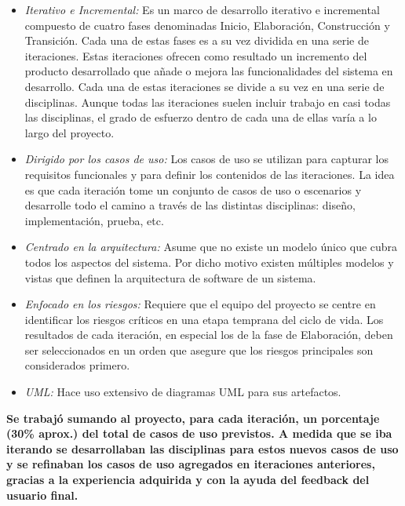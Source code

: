 \begin{itemize}
    \item \emph{Iterativo e Incremental:} Es un marco de desarrollo iterativo e incremental compuesto de cuatro fases denominadas Inicio, Elaboración, Construcción y Transición. Cada una de estas fases es a su vez dividida en una serie de iteraciones. Estas iteraciones ofrecen como resultado un incremento del producto desarrollado que añade o mejora las funcionalidades del sistema en desarrollo. Cada una de estas iteraciones se divide a su vez en una serie de disciplinas. Aunque todas las iteraciones suelen incluir trabajo en casi todas las disciplinas, el grado de esfuerzo dentro de cada una de ellas varía a lo largo del proyecto.
    \item \emph{Dirigido por los casos de uso:} Los casos de uso se utilizan para capturar los requisitos funcionales y para definir los contenidos de las iteraciones. La idea es que cada iteración tome un conjunto de casos de uso o escenarios y desarrolle todo el camino a través de las distintas disciplinas: diseño, implementación, prueba, etc.
    \item \emph{Centrado en la arquitectura:} Asume que no existe un modelo único que cubra todos los aspectos del sistema. Por dicho motivo existen múltiples modelos y vistas que definen la arquitectura de software de un sistema.
    \item \emph{Enfocado en los riesgos:} Requiere que el equipo del proyecto se centre en identificar los riesgos críticos en una etapa temprana del ciclo de vida. Los resultados de cada iteración, en especial los de la fase de Elaboración, deben ser seleccionados en un orden que asegure que los riesgos principales son considerados primero.
    \item \emph{UML:} Hace uso extensivo de diagramas UML para sus artefactos.
\end{itemize}

\textbf{Se trabajó sumando al proyecto, para cada iteración, un porcentaje (30\% aprox.) del total de casos de uso previstos.  A medida que se iba iterando se desarrollaban las disciplinas para estos nuevos casos de uso y se refinaban los casos de uso agregados en iteraciones anteriores, gracias a la experiencia adquirida y con la ayuda del feedback del usuario final.}



